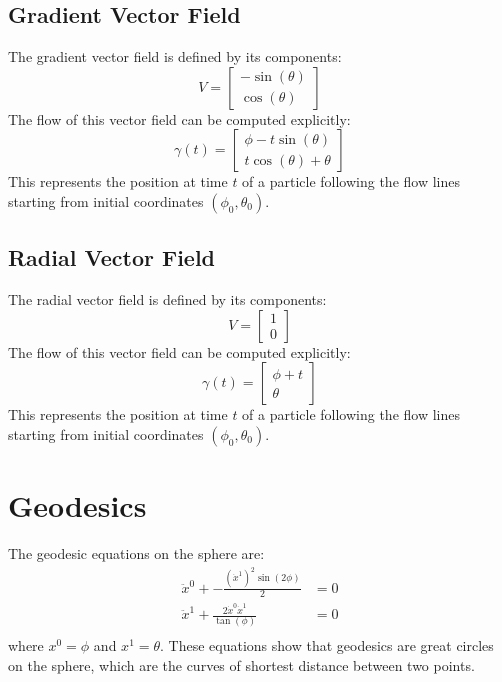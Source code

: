 \documentclass[12pt]{article}
\begin{document}
\subsection{Gradient Vector Field}
The gradient vector field is defined by its components:
\[
V = \left[\begin{matrix}- \sin{\left(\theta \right)}\\\cos{\left(\theta \right)}\end{matrix}\right]
\]
The flow of this vector field can be computed explicitly:
\[
\gamma(t) = \left[\begin{matrix}\phi - t \sin{\left(\theta \right)}\\t \cos{\left(\theta \right)} + \theta\end{matrix}\right]
\]
This represents the position at time $t$ of a particle following the flow lines starting from initial coordinates $(\phi_0, \theta_0)$.

\subsection{Radial Vector Field}
The radial vector field is defined by its components:
\[
V = \left[\begin{matrix}1\\0\end{matrix}\right]
\]
The flow of this vector field can be computed explicitly:
\[
\gamma(t) = \left[\begin{matrix}\phi + t\\\theta\end{matrix}\right]
\]
This represents the position at time $t$ of a particle following the flow lines starting from initial coordinates $(\phi_0, \theta_0)$.

\section{Geodesics}
The geodesic equations on the sphere are:
\[
\begin{aligned}
\ddot{x}^0 + - \frac{\left(\dot{x}^1\right)^{2} \sin{\left(2 \phi \right)}}{2} &= 0 \\
\ddot{x}^1 + \frac{2 \dot{x}^0 \dot{x}^1}{\tan{\left(\phi \right)}} &= 0 \\
\end{aligned}
\]
where $x^0 = \phi$ and $x^1 = \theta$. These equations show that geodesics are great circles on the sphere, which are the curves of shortest distance between two points.
\end{document}
